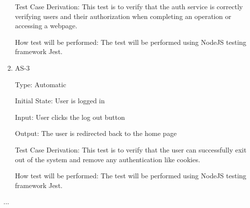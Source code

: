 \documentclass[12pt, titlepage]{article}
\begin{document}
\begin{enumerate}
		Test Case Derivation: This test is to verify that the auth service is correctly verifying users and their authorization when completing an operation or accessing a webpage. 
		
		How test will be performed: The test will be performed using NodeJS testing framework Jest.
		
		\item{AS-3\\}
		
		Type: Automatic
		
		Initial State: User is logged in
		
		Input: User clicks the log out button
		
		Output: The user is redirected back to the home page
		
		Test Case Derivation: This test is to verify that the user can successfully exit out of the system and remove any authentication like cookies. 
		
		How test will be performed: The test will be performed using NodeJS testing framework Jest.
		
	\end{enumerate}
	...
	
	
	
	
	
		
		
		
		
		
\end{document}
